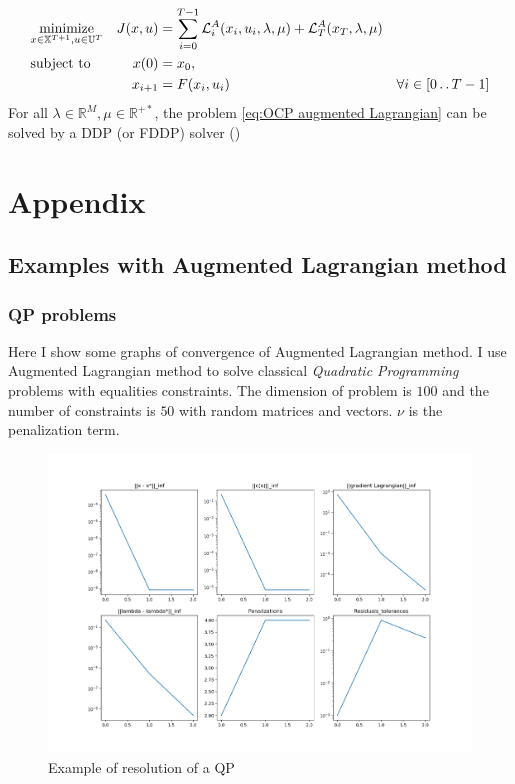 \documentclass{report}
\newcommand{\twodots}{\mathinner {\ldotp \ldotp}}
\begin{document}
\begin{equation}
\label{eq:OCP augmented Lagrangian}
\begin{aligned}
&\underset{x \in \mathbb{X}^{T+1}, u \in \mathbb{U}^T}{\text{minimize}}          &J(x, u) &=\sum_{i = 0}^{T-1} \mathcal{L}^A_i(x_i, u_i, \lambda, \mu) + \mathcal{L}^A_T(x_T, \lambda, \mu) & \\
&\text{subject to}       &x(0)      &= x_0,  & \\ %
&				  &x_{i+1}  &= F(x_i, u_i)  &\forall i \in [0 \twodots T-1] 
\end{aligned}
\end{equation}
For all $\lambda \in \mathbb{R}^M, \mu \in \mathbb{R}^{+*}$, the problem  \ref{eq:OCP augmented Lagrangian} can be solved by a DDP (or FDDP) solver (\cite{crocoddyl})
\chapter*{Appendix}
\section*{Examples with Augmented Lagrangian method}
\subsection*{QP problems}
Here I show some graphs of convergence of Augmented Lagrangian method. I use Augmented Lagrangian method to solve classical \emph{Quadratic Programming} problems with equalities constraints. The dimension of problem is $100$ and the number of constraints is $50$ with random matrices and vectors. $\nu$ is the penalization term.

\begin{figure}[h]
\centering
\includegraphics[scale=0.4]{SUCCESS}
\caption{Example of resolution of a QP}
\end{figure}
\end{document}
